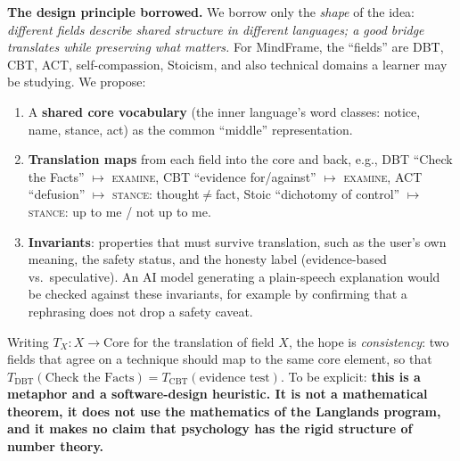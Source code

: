 \documentclass[11pt]{article}
\begin{document}
\textbf{The design principle borrowed.} We borrow only the \emph{shape} of the idea: \emph{different fields describe shared structure in different languages; a good bridge translates while preserving what matters.} For MindFrame, the ``fields'' are DBT, CBT, ACT, self-compassion, Stoicism, and also technical domains a learner may be studying. We propose:
\begin{enumerate}
\item A \textbf{shared core vocabulary} (the inner language's word classes: notice, name, stance, act) as the common ``middle'' representation.
\item \textbf{Translation maps} from each field into the core and back, e.g., DBT ``Check the Facts'' $\mapsto$ \textsc{examine}, CBT ``evidence for/against'' $\mapsto$ \textsc{examine}, ACT ``defusion'' $\mapsto$ \textsc{stance}: thought$\neq$fact, Stoic ``dichotomy of control'' $\mapsto$ \textsc{stance}: up to me / not up to me.
\item \textbf{Invariants}: properties that must survive translation, such as the user's own meaning, the safety status, and the honesty label (evidence-based vs.\ speculative). An AI model generating a plain-speech explanation would be checked against these invariants, for example by confirming that a rephrasing does not drop a safety caveat.
\end{enumerate}
Writing $T_X: X \to \text{Core}$ for the translation of field $X$, the hope is \emph{consistency}: two fields that agree on a technique should map to the same core element, so that $T_{\text{DBT}}(\text{Check the Facts}) = T_{\text{CBT}}(\text{evidence test})$. To be explicit: \textbf{this is a metaphor and a software-design heuristic. It is not a mathematical theorem, it does not use the mathematics of the Langlands program, and it makes no claim that psychology has the rigid structure of number theory.}
\end{document}
